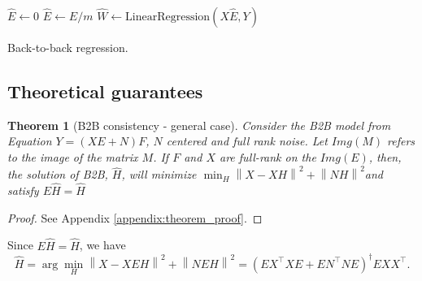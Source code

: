 \documentclass[preprint,12pt,3p]{elsarticle}
\newtheorem{theorem}{Theorem}
\begin{document}
\begin{algorithm}[H]
    $\hat{E} \leftarrow 0$\;
    $\hat{E} \leftarrow \hat{E} / m$\;
    $\hat{W} \leftarrow \text{LinearRegression}(X \hat{E}, Y)$\;
    \caption{Back-to-back regression.}
    \label{algorithm:b2br}
\end{algorithm}

\subsection{Theoretical guarantees}
\label{sec:theorem}

\begin{theorem}[B2B consistency - general case]

     Consider the B2B model from Equation $Y = (XE + N)F$, $N$ centered and full
     rank noise.
     Let $Img(M)$ refers to the image of the matrix $M$. If $F$ and $X$ are
     full-rank on the $Img(E)$, then, the solution of B2B, $\hat H$, will
     minimize
     $\min_H  \left \| X - XH\right\| ^2  + \left \| NH\right \| ^2$and satisfy $E\hat H = \hat H$
\end{theorem}
%
\begin{proof}
  See Appendix \ref{appendix:theorem_proof}.
\end{proof}

Since  $E\hat H = \hat H$, we have
\begin{equation}
  \hat H = \arg \min_H  \left \| X - XEH\right\| ^2  + \left \| NEH\right \| ^2 = (E X^\top XE +EN^\top NE) ^\dagger EXX^\top.
\end{equation}
\end{document}
